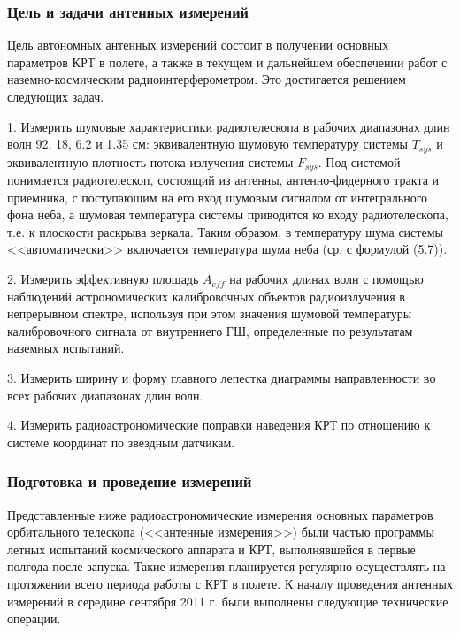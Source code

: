 \subsubsection{Цель и задачи антенных измерений}


Цель автономных антенных измерений состоит в получении основных
параметров КРТ в полете, а также в текущем и дальнейшем обеспечении работ
с наземно-космическим радиоинтерферометром.
Это достигается решением следующих задач.

1. Измерить шумовые характеристики радиотелескопа в рабочих диапазонах
длин волн 92, 18, 6.2 и 1.35 см: эквивалентную шумовую температуру системы
$T_{sys}$ и эквивалентную плотность потока излучения системы $F_{sys}$.
Под системой понимается радиотелескоп, состоящий из антенны, антенно-фидерного тракта и
приемника, с поступающим на его вход шумовым сигналом от интегрального фона неба,
а шумовая температура системы приводится ко входу радиотелескопа, т.е. к плоскости
раскрыва зеркала. Таким образом, в температуру шума системы <<автоматически>>
включается температура шума неба (ср. с формулой (5.7)).

2. Измерить эффективную площадь $A_{eff}$ на рабочих длинах волн с помощью
наблюдений астрономических калибровочных объектов радиоизлучения в непрерывном
спектре, используя при этом значения шумовой температуры
калибровочного сигнала от внутреннего ГШ,
определенные по результатам наземных испытаний.

3. Измерить ширину и форму главного лепестка диаграммы направленности
во всех рабочих диапазонах длин волн.

4. Измерить радиоастрономические поправки наведения КРТ по отношению к
системе координат по звездным датчикам.


\subsubsection{Подготовка и проведение измерений}


Представленные ниже радиоастрономические измерения основных параметров
орбитального телескопа (<<антенные измерения>>) были частью
программы летных испытаний космического аппарата и КРТ,
выполнявшейся в первые полгода после запуска.
Такие измерения планируется регулярно осуществлять на протяжении всего
периода работы с КРТ в полете. К началу проведения антенных измерений
в середине сентября 2011 г. были выполнены следующие технические
операции.

